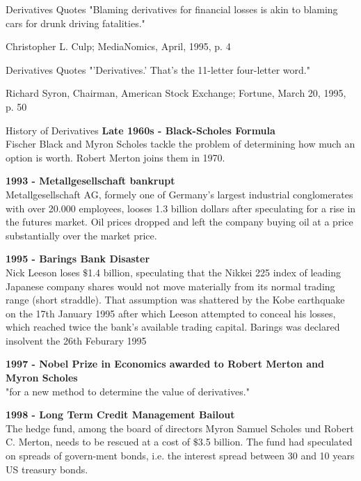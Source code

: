 Derivatives Quotes
	"Blaming derivatives for financial losses is akin to blaming cars for drunk driving fatalities."
	\begin{flushright}
		\begin{footnotesize}
	 Christopher L. Culp; MediaNomics, April, 1995, p. 4
	 \end{footnotesize}
	\end{flushright}


Derivatives Quotes
	"'Derivatives.' That's the 11-letter four-letter word."
	\begin{flushright}
		\begin{footnotesize}
		Richard Syron, Chairman, American Stock Exchange; Fortune, March 20, 1995, p. 50
	 \end{footnotesize}
	\end{flushright}


History of Derivatives
	\textbf{Late 1960s - Black-Scholes Formula}\\
		Fischer Black and Myron Scholes tackle the problem of determining how much an option is worth. Robert Merton joins them in 1970.
	
	\textbf{1993 - Metallgesellschaft bankrupt}\\
		Metallgesellschaft AG, formely one of Germany's largest industrial conglomerates with over 20.000 employees, 
		looses 1.3 billion dollars after speculating for a rise in the futures market. Oil prices 	dropped and left 
		the company buying oil at a price substantially over the market price.
	
	\textbf{1995 - Barings Bank Disaster }\\
		Nick Leeson loses $\$$1.4 billion, speculating that the Nikkei 225 index of leading Japanese company shares would
		not move materially from its normal trading range (short straddle). That assumption was shattered by the Kobe 
		earthquake on the 17th January 1995 after which Leeson attempted to conceal his losses, which reached twice the 
		bank's available trading capital. Barings was declared insolvent the 26th Feburary 1995

	\textbf{1997 - Nobel Prize in Economics awarded to Robert Merton and Myron Scholes}\\
		"for a new method to determine the value of derivatives."

	\textbf{1998 - Long Term Credit Management Bailout}\\
		The hedge fund, among the board of directors Myron Samuel Scholes und Robert C. Merton, needs to be rescued at
		a cost of $\$$3.5 billion. The fund had speculated on spreads of govern-ment bonds, i.e. the interest 
		spread between 30 and 10 years US treasury bonds.

